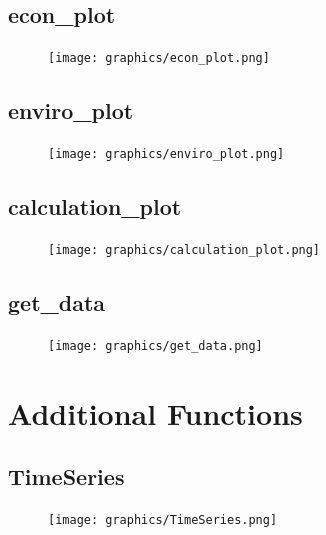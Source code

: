 \documentclass{article}
\begin{document}
    \subsection{econ\_plot}
    \begin{figure}[h!]
        \begin{center}
            \texttt{[image: graphics/econ\_plot.png]}
        \end{center}                
    \end{figure} 
    \newpage  
    \subsection{enviro\_plot}
    \begin{figure}[h!]
        \begin{center}
            \texttt{[image: graphics/enviro\_plot.png]}
        \end{center}                
    \end{figure}   
    \subsection{calculation\_plot}
    \begin{figure}[h!]
        \begin{center}
            \texttt{[image: graphics/calculation\_plot.png]}
        \end{center}                
    \end{figure}  
    \newpage 
    \subsection{get\_data}
    \begin{figure}[h!]
        \begin{center}
            \texttt{[image: graphics/get\_data.png]}
        \end{center}                
    \end{figure}   
\newpage
\section{Additional Functions}
    \subsection{TimeSeries}
    \begin{figure}[h!]
        \begin{center}
            \texttt{[image: graphics/TimeSeries.png]}
        \end{center}                
    \end{figure}   
    \newpage
\end{document}
